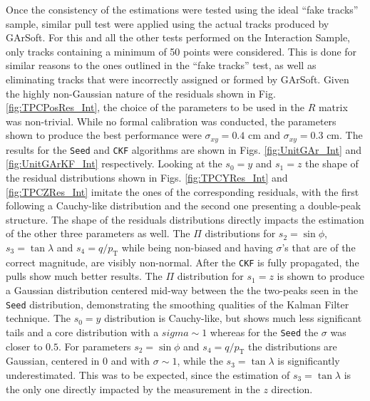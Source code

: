 Once the consistency of the estimations were tested using the ideal \enquote{fake tracks} sample, similar pull test were applied using the actual tracks produced by GArSoft. For this and all the other tests performed on the Interaction Sample, only tracks containing a minimum of 50 points were considered. This is done for similar reasons to the ones outlined in the \enquote{fake tracks} test, as well as eliminating tracks that were incorrectly assigned or formed by GArSoft.  Given the highly non-Gaussian nature of the residuals shown in Fig. \ref{fig:TPCPosRes_Int}, the choice of the parameters to be used in the $R$ matrix was non-trivial. While no formal calibration was conducted, the parameters shown to produce the best performance were $\sigma_{xy}=0.4$ cm and $\sigma_{xy}=0.3$ cm. The results for the \texttt{Seed} and \texttt{CKF} algorithms are shown in Figs. \ref{fig:UnitGAr_Int} and \ref{fig:UnitGArKF_Int} respectively. Looking at the $s_0=y$ and $s_1=z$ the shape of the residual distributions shown in Figs. \ref{fig:TPCYRes_Int} and \ref{fig:TPCZRes_Int} imitate the ones of the corresponding residuals, with the first following a Cauchy-like distribution and the second one presenting a double-peak structure. The shape of the residuals distributions directly impacts the estimation of the other three parameters as well. The $\Pi$ distributions for $s_2=\sin\phi$, $s_3=\tan\lambda$ and $s_4=q/p_\textrm{T}$ while being non-biased and having $\sigma$'s that are of the correct magnitude, are visibly non-normal. After the \texttt{CKF} is fully propagated, the pulls show much better results. The $\Pi$ distribution for $s_1=z$ is shown to produce a Gaussian distribution centered mid-way between the the two-peaks seen in the \texttt{Seed} distribution, demonstrating the smoothing qualities of the Kalman Filter technique. The $s_0=y$ distribution is Cauchy-like, but shows much less significant tails and a core distribution with a $sigma \sim 1$ whereas for the \texttt{Seed} the $\sigma$ was closer to $0.5$. For parameters $s_2=\sin\phi$ and $s_4=q/p_\textrm{T}$ the distributions are Gaussian, centered in 0 and with $\sigma\sim 1$, while the $s_3=\tan\lambda$ is significantly underestimated. This was to be expected, since the estimation of $s_3=\tan\lambda$ is the only one directly impacted by the measurement in the $z$ direction.

